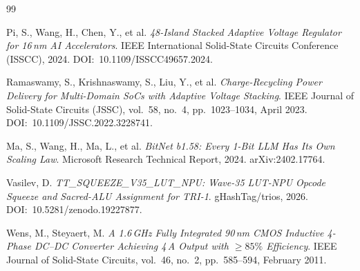 \begin{thebibliography}{99}

  Pi, S., Wang, H., Chen, Y., et al.
  \emph{48-Island Stacked Adaptive Voltage Regulator for 16\,nm AI Accelerators}.
  IEEE International Solid-State Circuits Conference (ISSCC), 2024.
  DOI:~10.1109/ISSCC49657.2024.

  Ramaswamy, S., Krishnaswamy, S., Liu, Y., et al.
  \emph{Charge-Recycling Power Delivery for Multi-Domain SoCs with
  Adaptive Voltage Stacking}.
  IEEE Journal of Solid-State Circuits (JSSC), vol.~58, no.~4, pp.~1023--1034,
  April 2023.
  DOI:~10.1109/JSSC.2022.3228741.

  Ma, S., Wang, H., Ma, L., et al.
  \emph{BitNet b1.58: Every 1-Bit LLM Has Its Own Scaling Law}.
  Microsoft Research Technical Report, 2024.
  arXiv:2402.17764.

  Vasilev, D.
  \emph{TT\_SQUEEZE\_V35\_LUT\_NPU: Wave-35 LUT-NPU Opcode Squeeze and
  Sacred-ALU Assignment for TRI-1}.
  gHashTag/trios, 2026.
  DOI:~10.5281/zenodo.19227877.

  Wens, M., Steyaert, M.
  \emph{A 1.6\,GHz Fully Integrated 90\,nm CMOS Inductive 4-Phase
  DC--DC Converter Achieving 4\,A Output with $\geq 85\%$ Efficiency}.
  IEEE Journal of Solid-State Circuits, vol.~46, no.~2, pp.~585--594,
  February 2011.

\end{thebibliography}
